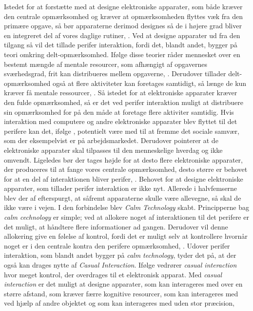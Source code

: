 Istedet for at forstætte med at designe elektroniske apparater, som både kræver den centrale opmærksomhed og kræver at opmærksomheden flyttes væk fra den primære opgave, så bør apparaterne derimod designes så de i højere grad bliver en integreret del af vores daglige rutiner, \parencite[s. 239]{PDF:PICharacteristicsAndConsiderations}. Ved at designe apparater ud fra den tilgang så vil det tillade perifer interaktion, fordi det, blandt andet, bygger på teori omkring delt-opmærksomhed. Ifølge disse teorier råder mennesket over en bestemt mængde af mentale resourcer, som afhængigt af opgavernes sværhedsgrad, frit kan distribueres mellem opgaverne, \parencite[s. 240]{PDF:PICharacteristicsAndConsiderations}. Derudover tillader delt-opmærksomhed også at flere aktiviteter kan foretages samtidigt, så længe de kun kræver få mentale ressourcer, \parencite[s. 2]{PDF:FacilitatingPIDesignAndEvaluation}. Så istedet for at elektroniske apparater kræver den fulde opmærksomhed, så er det ved perifer interaktion muligt at distribuere sin opmærksomhed for på den måde at foretage flere aktiviter samtidig. Hvis interaktion med computere og andre elektroniske apparater blev flyttet til det perifere kan det, ifølge \textcite[s. 11]{PDF:TheComputerWeiser}, potentielt være med til at fremme det sociale samvær, som der eksempelvist er på arbejdsmarkedet. Derudover pointerer \textcite[s. 11]{PDF:TheComputerWeiser} at de elektroniske apparater skal tilpasses til den menneskelige hverdag og ikke omvendt. Ligeledes bør der tages højde for at desto flere elektroniske apparater, der produceres til at fange vores centrale opmærksomhed, desto større er behovet for at en del af interaktionen bliver perifer, \parencite[s. 240]{PDF:PICharacteristicsAndConsiderations}. \blankline
%
Behovet for at designe elektroniske apparater, som tillader perifer interaktion er ikke nyt. Allerede i halvfemserne blev der af \textcite[s. 3]{PDF:TheComingAgeOfCalmTech} efterspurgt, at såfremt apparaterne skulle være allevegne, så skal de ikke være i vejen. I den forbindelse blev \textit{Calm Technology} skabt. Principperne bag \textit{calm cechnology} er simple; ved at allokere noget af interaktionen til det perifere er det muligt, at håndtere flere informationer ad gangen. Derudover vil denne allokering give en følelse af kontrol, fordi det er muligt selv at kontrollere hvornår noget er i den centrale kontra den perifere opmærksomhed, \parencite[s. 4]{PDF:TheComingAgeOfCalmTech}. Udover perifer interaktion, som blandt andet bygger på \textit{calm technology}, tyder det på, at der også kan drages nytte af \textit{Casual Interaction}. Ifølge \textcite[ss. 118-119]{PDF:PeripheralInteraction} vedrører \textit{casual interaction} hvor meget kontrol, der overdrages til et elektronisk apparat. Med \textit{casual interaction} er det muligt at designe apparater, som kan interageres med over en større afstand, som kræver færre kognitive resourcer, som kan interageres med ved hjælp af andre objektet og som kan interageres med uden stor præcision, \parencite[s. 128]{PDF:PeripheralInteraction}        
